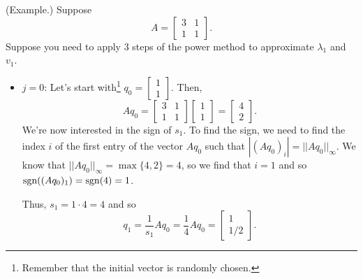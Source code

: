 \documentclass[letterpaper]{article}
\newcommand{\0}{\mathbf{0}}
\begin{document}
\begin{mdframed}
    (Example.) Suppose \[A = \begin{bmatrix}
        3 & 1 \\ 1 & 1
    \end{bmatrix}.\] Suppose you need to apply 3 steps of the power method to approximate $\lambda_1$ and $v_1$. 

    \begin{itemize}
        \item $j = 0$: Let's start with\footnote{Remember that the initial vector is randomly chosen.} $q_0 = \begin{bmatrix}
            1 \\ 1
        \end{bmatrix}$. Then, 
        \[Aq_0 = \begin{bmatrix}
            3 & 1 \\ 1 & 1
        \end{bmatrix} \begin{bmatrix}
            1 \\ 1
        \end{bmatrix} = \begin{bmatrix}
            4 \\ 2
        \end{bmatrix}.\]
        We're now interested in the sign of $s_{1}$. To find the sign, we need to find the index $i$ of the first entry of the vector $Aq_0$ such that $|(Aq_0)_i| = ||Aq_0||_\infty$. We know that $||Aq_0||_\infty = \max\{4, 2\} = 4$, so we find that $i = 1$ and so $\operatorname{sgn}((Aq_0)_1) = \operatorname{sgn}(4) = 1$. 

        \bigskip 

        Thus, $s_{1} = 1 \cdot 4 = 4$ and so \[q_1 = \frac{1}{s_1}Aq_0 = \frac{1}{4}Aq_0 = \begin{bmatrix}
            1 \\ 1/2
        \end{bmatrix}.\]


\end{itemize}
\end{mdframed}
\end{document}
